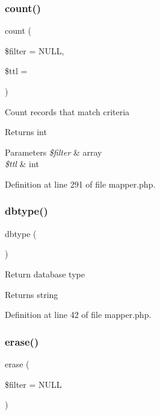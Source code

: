 \subsubsection{\texorpdfstring{count()}{count()}}
{\footnotesize\ttfamily count (\begin{DoxyParamCaption}\item[{}]{\$filter = {\ttfamily NULL},  }\item[{}]{\$ttl = {} }\end{DoxyParamCaption})}

Count records that match criteria \begin{DoxyReturn}{Returns}
int 
\end{DoxyReturn}

\begin{DoxyParams}{Parameters}
{\em \$filter} & array \\
\hline
{\em \$ttl} & int \\
\hline
\end{DoxyParams}


Definition at line 291 of file mapper.\+php.

\hypertarget{class_d_b_1_1_jig_1_1_mapper_a38948c2fb1711f49b72f123cbd91e611}{}\label{class_d_b_1_1_jig_1_1_mapper_a38948c2fb1711f49b72f123cbd91e611} 
\subsubsection{\texorpdfstring{dbtype()}{dbtype()}}
{\footnotesize\ttfamily dbtype (\begin{DoxyParamCaption}{ }\end{DoxyParamCaption})}

Return database type \begin{DoxyReturn}{Returns}
string 
\end{DoxyReturn}


Definition at line 42 of file mapper.\+php.

\hypertarget{class_d_b_1_1_jig_1_1_mapper_aa7210074cfc1eda78dc492d8b8a96616}{}\label{class_d_b_1_1_jig_1_1_mapper_aa7210074cfc1eda78dc492d8b8a96616} 
\subsubsection{\texorpdfstring{erase()}{erase()}}
{\footnotesize\ttfamily erase (\begin{DoxyParamCaption}\item[{}]{\$filter = {\ttfamily NULL} }\end{DoxyParamCaption})}

